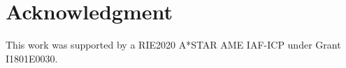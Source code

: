 \section*{Acknowledgment}
This work was supported by a RIE2020 A*STAR AME IAF-ICP under Grant I1801E0030.

